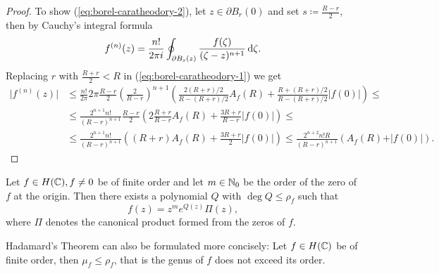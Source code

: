 \begin{proof}
    To show (\ref{eq:borel-caratheodory-2}), let $z \in \partial B_r(0)$ and set $s \coloneqq \frac{R - r}{2}$, then by Cauchy's integral formula
    \begin{equation*}
        f^{(n)}(z) = \frac{n!}{2 \pi i} \oint_{\partial B_s(z)} \frac{f(\zeta)}{(\zeta - z)^{n+1}} \mathop{}\!\mathrm{d} \zeta.
    \end{equation*}
    Replacing $r$ with $\frac{R + r}{2} < R$ in (\ref{eq:borel-caratheodory-1}) we get
    \begin{align*}
        \vert f^{(n)}(z) \vert &\leq \frac{n!}{2 \pi} 2 \pi \frac{R - r}{2} \left( \frac{2}{R - r} \right)^{n+1} \left( \frac{2 (R + r)/2}{R - (R+r)/2} A_f(R) + \frac{R + (R + r)/2}{R - (R + r)/2} \vert f(0) \vert \right) \leq \\
        &\leq \frac{2^{n+1} n!}{(R - r)^{n+1}} \frac{R - r}{2} \left( 2 \frac{R+r}{R-r} A_f(R) + \frac{3R + r}{R - r} \vert f(0) \vert \right) \leq \\
        &\leq \frac{2^{n+1} n!}{(R - r)^{n+1}} \left( (R+r) A_f(R) + \frac{3R + r}{2} \vert f(0) \vert \right) \leq \frac{2^{n+2} n! R}{(R - r)^{n+1}} (A_f(R) + \vert f(0) \vert).
    \end{align*}
\end{proof}

\begin{theorem}[Hadamard]
    Let $f \in H(\mathbb{C}), f \neq 0$ be of finite order and let $m \in \mathbb{N}_0$ be the order of the zero of $f$ at the origin. Then there exists a polynomial $Q$ with $\deg Q \leq \rho_f$ such that
    \begin{equation}
        f(z) = z^m e^{Q(z)} \Pi(z),
    \end{equation}
    where $\Pi$ denotes the canonical product formed from the zeros of $f$.
\end{theorem}

Hadamard's Theorem can also be formulated more concisely: Let $f \in H(\mathbb{C})$ be of finite order, then $\mu_f \leq \rho_f$, that is the genus of $f$ does not exceed its order.

